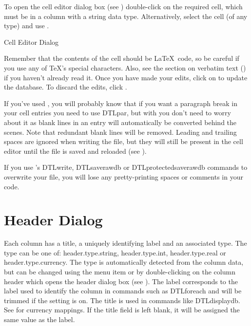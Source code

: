 To open the cell editor dialog box (see )
double-click on the required cell, which must be in a column with a 
string data type. Alternatively, select the cell (of any type) and use 
.

 {%
 }
 {Cell Editor Dialog}

Remember that the contents of the cell should be \LaTeX\ code, so be
careful if you use any of \TeX's special characters. Also, see the
section on verbatim text () if you haven't 
already read it.
Once you have made your edits, click on 
to update the database. To discard the edits, click 
.

If you've used , you will probably know that 
if you want a paragraph break in your cell entries you need to use 
\gls{DTLpar}, but with  you don't need to worry about it 
as blank lines in an entry will automatically be converted behind 
the scenes. Note that redundant blank lines will be removed. Leading
and trailing spaces are ignored when writing the  file,
but they will still be present in the cell editor until the file is
saved and reloaded (see ).

\begin{important}
If you use 's \gls{DTLwrite},
\gls{DTLsaverawdb} or \gls{DTLprotectedsaverawdb} commands to
overwrite your file, you will lose any pretty-printing spaces or
comments in your code.
\end{important}

\section{Header Dialog}\label{sec:editheader}

Each column has a title, a uniquely identifying label
and an associated type. The type can be one of:
\gls{header.type.string}, 
\gls{header.type.int}, 
\gls{header.type.real} or 
\gls{header.type.currency}.
The type is automatically detected from the column data,
but can be changed using the 
menu item or by double-clicking on the column header which opens the 
header dialog box (see ). The label corresponds 
to the label used to identify the column in commands such
as \gls{DTLforeach} and will be trimmed if the 
 setting is on. The title is used in 
commands like \gls{DTLdisplaydb}. See  for 
currency mappings. If the title field is left blank, it will be assigned 
the same value as the label.

